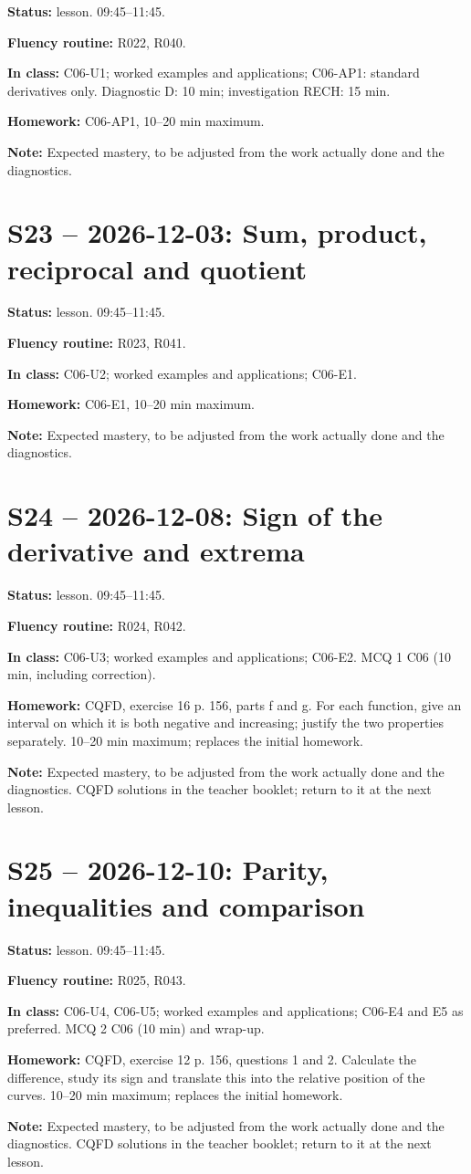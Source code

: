 \textbf{Status:} lesson. 09:45–11:45.\par\textbf{Fluency routine:} R022, R040.\par\textbf{In class:} C06-U1; worked examples and applications; C06-AP1: standard derivatives only. Diagnostic D: 10 min; investigation RECH: 15 min.\par\textbf{Homework:} C06-AP1, 10–20 min maximum.\par\textbf{Note:} Expected mastery, to be adjusted from the work actually done and the diagnostics.
\section*{S23 -- 2026-12-03: Sum, product, reciprocal and quotient}
\textbf{Status:} lesson. 09:45–11:45.\par\textbf{Fluency routine:} R023, R041.\par\textbf{In class:} C06-U2; worked examples and applications; C06-E1. \par\textbf{Homework:} C06-E1, 10–20 min maximum.\par\textbf{Note:} Expected mastery, to be adjusted from the work actually done and the diagnostics.
\section*{S24 -- 2026-12-08: Sign of the derivative and extrema}
\textbf{Status:} lesson. 09:45–11:45.\par\textbf{Fluency routine:} R024, R042.\par\textbf{In class:} C06-U3; worked examples and applications; C06-E2.  MCQ 1 C06 (10 min, including correction).\par\textbf{Homework:} CQFD, exercise 16 p. 156, parts f and g. For each function, give an interval on which it is both negative and increasing; justify the two properties separately. 10–20 min maximum; replaces the initial homework.\par\textbf{Note:} Expected mastery, to be adjusted from the work actually done and the diagnostics. CQFD solutions in the teacher booklet; return to it at the next lesson.
\section*{S25 -- 2026-12-10: Parity, inequalities and comparison}
\textbf{Status:} lesson. 09:45–11:45.\par\textbf{Fluency routine:} R025, R043.\par\textbf{In class:} C06-U4, C06-U5; worked examples and applications; C06-E4 and E5 as preferred.  MCQ 2 C06 (10 min) and wrap-up.\par\textbf{Homework:} CQFD, exercise 12 p. 156, questions 1 and 2. Calculate the difference, study its sign and translate this into the relative position of the curves. 10–20 min maximum; replaces the initial homework.\par\textbf{Note:} Expected mastery, to be adjusted from the work actually done and the diagnostics. CQFD solutions in the teacher booklet; return to it at the next lesson.
